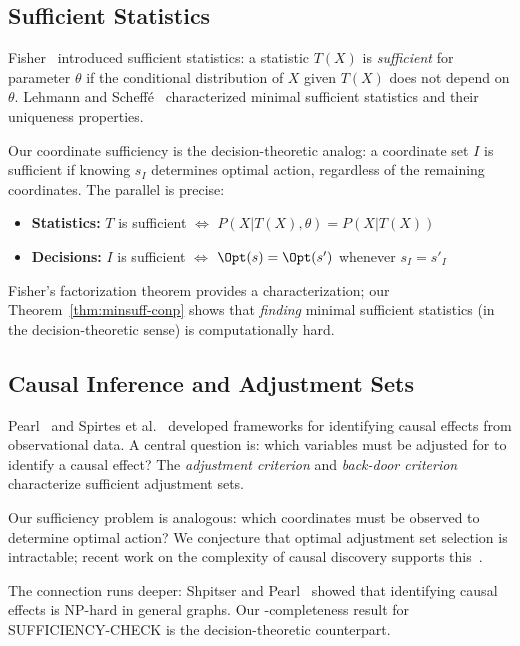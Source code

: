\subsection{Sufficient Statistics}

Fisher~\cite{fisher1922mathematical} introduced sufficient statistics: a statistic $T(X)$ is \emph{sufficient} for parameter $\theta$ if the conditional distribution of $X$ given $T(X)$ does not depend on $\theta$. Lehmann and Scheffé~\cite{lehmann1950completeness} characterized minimal sufficient statistics and their uniqueness properties.

Our coordinate sufficiency is the decision-theoretic analog: a coordinate set $I$ is sufficient if knowing $s_I$ determines optimal action, regardless of the remaining coordinates. The parallel is precise:
\begin{itemize}
\item \textbf{Statistics:} $T$ is sufficient $\iff$ $P(X | T(X), \theta) = P(X | T(X))$
\item \textbf{Decisions:} $I$ is sufficient $\iff$ $\Opt(s) = \Opt(s')$ whenever $s_I = s'_I$
\end{itemize}

Fisher's factorization theorem provides a characterization; our Theorem~\ref{thm:minsuff-conp} shows that \emph{finding} minimal sufficient statistics (in the decision-theoretic sense) is computationally hard.

\subsection{Causal Inference and Adjustment Sets}

Pearl~\cite{pearl2009causality} and Spirtes et al.~\cite{spirtes2000causation} developed frameworks for identifying causal effects from observational data. A central question is: which variables must be adjusted for to identify a causal effect? The \emph{adjustment criterion} and \emph{back-door criterion} characterize sufficient adjustment sets.

Our sufficiency problem is analogous: which coordinates must be observed to determine optimal action? We conjecture that optimal adjustment set selection is intractable; recent work on the complexity of causal discovery supports this~\cite{chickering2004large}.

The connection runs deeper: Shpitser and Pearl~\cite{shpitser2006identification} showed that identifying causal effects is NP-hard in general graphs. Our \coNP-completeness result for SUFFICIENCY-CHECK is the decision-theoretic counterpart.

